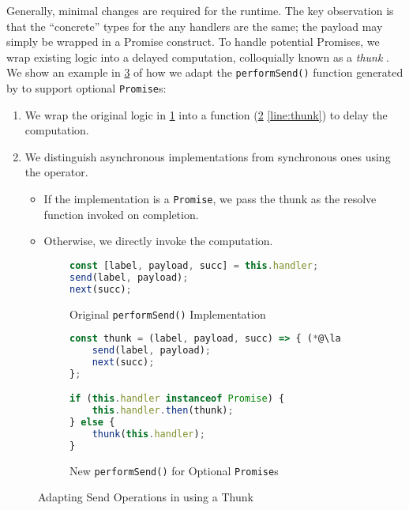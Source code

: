 Generally, minimal changes are required for the runtime.
The key observation is that the ``concrete'' types for the any
handlers are the same; the payload may simply be wrapped in a Promise
construct.
To handle potential Promises, we wrap existing logic
into a delayed computation, colloquially known as a \textit{thunk}
\cite{Thunk}.
We show an example in \cref{fig:thunk} of how we
adapt the \texttt{performSend()} function generated by
 to support optional \texttt{Promise}s:

\begin{enumerate}
\item
We wrap the original logic in \cref{subfig:originalthunk} into a
function (\cref{subfig:newthunk} \cref{line:thunk})
to delay the computation.

\item
We distinguish asynchronous implementations
from synchronous ones using the  operator.

\begin{itemize}
\item
If the implementation is a \texttt{Promise}, we pass
the thunk as the resolve function invoked on completion.

\item
Otherwise, we directly invoke the computation.
\end{itemize}

\end{enumerate}

\begin{figure}[!h]
\begin{subfigure}{\textwidth}
\begin{lstlisting}[language=javascript,tabsize=2]
const [label, payload, succ] = this.handler;
send(label, payload);
next(succ);
\end{lstlisting}
\caption{Original \texttt{performSend()} Implementation}
\label{subfig:originalthunk}
\end{subfigure}
\hfill
\begin{subfigure}{\textwidth}
\begin{lstlisting}[language=javascript,tabsize=2]
const thunk = (label, payload, succ) => { (*@\label{line:thunk}@*)
	send(label, payload);
	next(succ);	
};

if (this.handler instanceof Promise) {
	this.handler.then(thunk);
} else {
	thunk(this.handler);
}
\end{lstlisting}
\caption{New \texttt{performSend()} for Optional \texttt{Promise}s}
\label{subfig:newthunk}
\end{subfigure}
\caption{Adapting Send Operations in 
using a Thunk}
\label{fig:thunk}
\end{figure}


